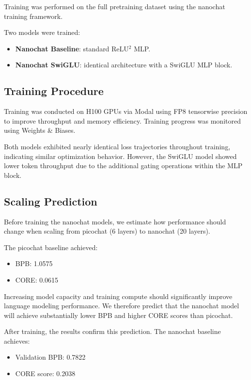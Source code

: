 Training was performed on the full pretraining dataset using
the nanochat training framework.

Two models were trained:

\begin{itemize}
\item \textbf{Nanochat Baseline}: standard ReLU$^2$ MLP.
\item \textbf{Nanochat SwiGLU}: identical architecture with a SwiGLU MLP block.
\end{itemize}

\subsection{Training Procedure}

Training was conducted on H100 GPUs via Modal using FP8 tensorwise
precision to improve throughput and memory efficiency. Training progress
was monitored using Weights \& Biases.

Both models exhibited nearly identical loss trajectories throughout
training, indicating similar optimization behavior. However, the SwiGLU
model showed lower token throughput due to the additional gating
operations within the MLP block.

\subsection{Scaling Prediction}

Before training the nanochat models, we estimate how performance should
change when scaling from picochat (6 layers) to nanochat (20 layers).

The picochat baseline achieved:

\begin{itemize}
\item BPB: 1.0575
\item CORE: 0.0615
\end{itemize}

Increasing model capacity and training compute should significantly
improve language modeling performance. We therefore predict that the
nanochat model will achieve substantially lower BPB and higher CORE
scores than picochat.

After training, the results confirm this prediction. The nanochat
baseline achieves:

\begin{itemize}
\item Validation BPB: 0.7822
\item CORE score: 0.2038
\end{itemize}

